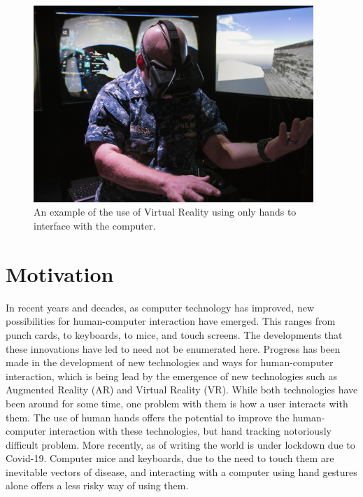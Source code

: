 \begin{figure}
    \centering
\includegraphics[width=400px]{figs/general/vr_example.jpg}
\caption{An example of the use of Virtual Reality using only hands to interface with the computer\protect\footnotemark.}
\label{fig:intro:htex}
\end{figure}

\section{Motivation}
\label{sec:intro:mot}
In recent years and decades, as computer technology has improved, new possibilities for human-computer interaction have emerged. This ranges from punch cards, to keyboards, to mice, and touch screens. The developments that these innovations have led to need not be enumerated here. Progress has been made in the development of new technologies and ways for human-computer interaction, which is being lead by the emergence of new technologies such as Augmented Reality (AR) and Virtual Reality (VR). While both technologies have been around for some time, one problem with them is how a user interacts with them. The use of human hands offers the potential to improve the human-computer interaction with these technologies, but hand tracking notoriously difficult problem. More recently, as of writing the world is under lockdown due to Covid-19. Computer mice and keyboards, due to the need to touch them are inevitable vectors of disease, and interacting with a computer using hand gestures alone offers a less risky way of using them. 

